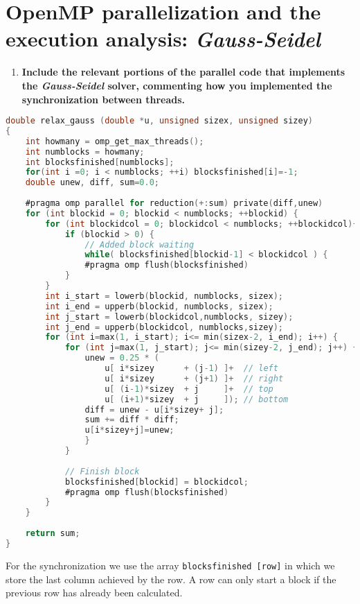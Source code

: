 \documentclass[a4paper]{article}
\newenvironment{questionenum}{%
\setlist[enumerate]{resume}
\restartlist{enumerate}
\newcommand{\question}[1]{
\begin{enumerate}
	\item\bfseries ##1
\end{enumerate}
}}{%
}
\begin{document}
\section{OpenMP parallelization and the execution analysis: \emph{Gauss-Seidel}}
\begin{questionenum}
	\question{Include the relevant portions of the parallel code that implements the \emph{Gauss-Seidel} solver, commenting how you implemented the synchronization between threads.}
	
	\begin{center}
		\begin{minipage}{0.8\textwidth}
			\begin{lstlisting}[language=C, title=\texttt{solver-omp-gauss.c}]
double relax_gauss (double *u, unsigned sizex, unsigned sizey)
{    
	int howmany = omp_get_max_threads();
	int numblocks = howmany;
	int blocksfinished[numblocks];
	for(int i =0; i < numblocks; ++i) blocksfinished[i]=-1;
	double unew, diff, sum=0.0;
	
	#pragma omp parallel for reduction(+:sum) private(diff,unew)
	for (int blockid = 0; blockid < numblocks; ++blockid) {
		for (int blockidcol = 0; blockidcol < numblocks; ++blockidcol){
			if (blockid > 0) {
				// Added block waiting
				while( blocksfinished[blockid-1] < blockidcol ) {
				#pragma omp flush(blocksfinished)
			}
		}
		int i_start = lowerb(blockid, numblocks, sizex);
		int i_end = upperb(blockid, numblocks, sizex);
		int j_start = lowerb(blockidcol,numblocks, sizey);
		int j_end = upperb(blockidcol, numblocks,sizey);
		for (int i=max(1, i_start); i<= min(sizex-2, i_end); i++) {
			for (int j=max(1, j_start); j<= min(sizey-2, j_end); j++) {
				unew = 0.25 * (
					u[ i*sizey 		+ (j-1) ]+  // left
					u[ i*sizey		+ (j+1) ]+  // right
					u[ (i-1)*sizey	+ j     ]+  // top
					u[ (i+1)*sizey	+ j     ]); // bottom
				diff = unew - u[i*sizey+ j];
				sum += diff * diff;
				u[i*sizey+j]=unew;
				}
			}
			
			// Finish block
			blocksfinished[blockid] = blockidcol;
			#pragma omp flush(blocksfinished)
		}
	}
	
	return sum;
}
			\end{lstlisting}
		\end{minipage}
	\end{center}
	
	For the synchronization we use the array \texttt{blocksfinished [row]} in which we store the last column achieved by the row. A row can only start a block if the previous row has already been calculated.
	

\end{questionenum}
\end{document}
